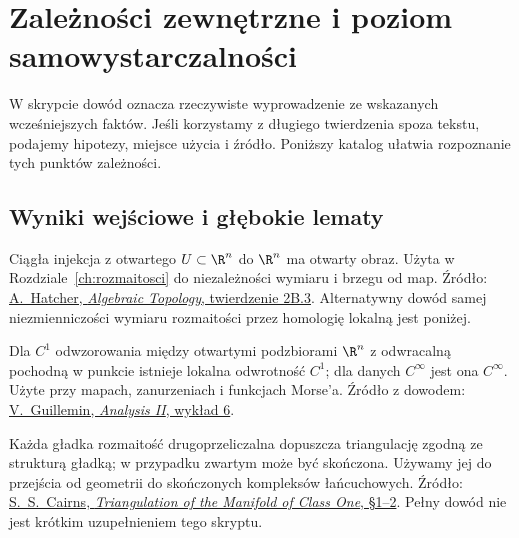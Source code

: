 \chapter{Zależności zewnętrzne i poziom samowystarczalności}
\label{app:wyniki-zewnetrzne}

W skrypcie dowód oznacza rzeczywiste
wyprowadzenie ze wskazanych wcześniejszych
faktów. Jeśli korzystamy z długiego
twierdzenia spoza tekstu, podajemy
hipotezy, miejsce użycia i źródło.
Poniższy katalog ułatwia rozpoznanie
tych punktów zależności.

\section{Wyniki wejściowe i głębokie lematy}
\label{sec:katalog-wynikow}

\begin{description}[leftmargin=2.9cm,style=nextline]
\item[Niezmienniczość obszaru.]
  Ciągła injekcja z otwartego
  $U\subset\R^n$ do $\R^n$
  ma otwarty obraz. Użyta w
  Rozdziale~\ref{ch:rozmaitosci}
  do niezależności wymiaru i
  brzegu od map.
  Źródło:
  \href{https://pi.math.cornell.edu/~hatcher/AT/AT.pdf}
  {A.\ Hatcher, \emph{Algebraic Topology},
  twierdzenie 2B.3}.
  Alternatywny dowód samej
  niezmienniczości wymiaru rozmaitości
  przez homologię lokalną jest poniżej.

\item[Twierdzenie o funkcji odwrotnej.]
  Dla $C^1$ odwzorowania między
  otwartymi podzbiorami $\R^n$
  z odwracalną pochodną w punkcie
  istnieje lokalna odwrotność $C^1$;
  dla danych $C^\infty$ jest ona
  $C^\infty$. Użyte przy mapach,
  zanurzeniach i funkcjach Morse'a.
  Źródło z dowodem:
  \href{https://www.ocw.mit.edu/courses/18-101-analysis-ii-fall-2005/d2c8fc5fe57cd59efc99caa048983d4c_lecture6.pdf}
  {V.\ Guillemin, \emph{Analysis II},
  wykład 6}.

\item[Triangulacja gładka.]
  Każda gładka rozmaitość
  drugoprzeliczalna dopuszcza
  triangulację zgodną ze
  strukturą gładką; w przypadku
  zwartym może być skończona.
  Używamy jej do przejścia od
  geometrii do skończonych
  kompleksów łańcuchowych.
  Źródło:
  \href{https://www.ams.org/bull/1935-41-08/S0002-9904-1935-06140-3/S0002-9904-1935-06140-3.pdf}
  {S.~S.\ Cairns, \emph{Triangulation of the
  Manifold of Class One}, §1--2}.
  Pełny dowód nie jest krótkim
  uzupełnieniem tego skryptu.


\end{description}

